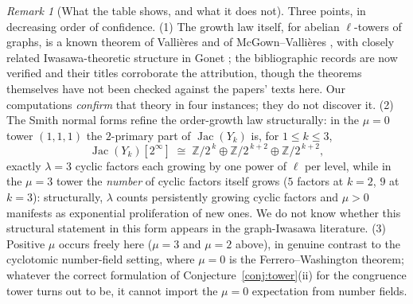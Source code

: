 \documentclass[11pt]{amsart}
\numberwithin{equation}{section}
\theoremstyle{definition}
\theoremstyle{remark}
\newtheorem{remark}[theorem]{Remark}
\newcommand{\Z}{\mathbb{Z}}
\newcommand{\Jac}{\operatorname{Jac}}
\begin{document}
\begin{remark}[What the table shows, and what it does not]\label{rem:towerhonest}
Three points, in decreasing order of confidence. (1) The growth law itself, for abelian
$\ell$-towers of graphs, is a known theorem of Vallières and of McGown--Vallières
\cite{Vallieres,McGownVallieres}, with closely related Iwasawa-theoretic structure in
Gonet \cite{Gonet}; the bibliographic records are now verified and their titles
corroborate the attribution, though the theorems themselves have not been checked
against the papers' texts here. Our computations \emph{confirm} that theory in four
instances; they do not discover it. (2) The Smith normal forms refine the order-growth
law structurally: in the $\mu=0$ tower $(1,1,1)$ the $2$-primary part of $\Jac(Y_k)$ is,
for $1\le k\le3$,
\[
\Jac(Y_k)[2^\infty]\;\cong\;\Z/2^{\,k}\oplus\Z/2^{\,k+2}\oplus\Z/2^{\,k+2},
\]
exactly $\lambda=3$ cyclic factors each growing by one power of $\ell$ per level, while
in the $\mu=3$ tower the \emph{number} of cyclic factors itself grows ($5$ factors at
$k=2$, $9$ at $k=3$): structurally, $\lambda$ counts persistently growing cyclic factors
and $\mu>0$ manifests as exponential proliferation of new ones. We do not know whether
this structural statement in this form appears in the graph-Iwasawa literature.
(3) Positive $\mu$ occurs freely here ($\mu=3$ and $\mu=2$ above), in genuine contrast to
the cyclotomic number-field setting, where $\mu=0$ is the Ferrero--Washington theorem;
whatever the correct formulation of Conjecture~\ref{conj:tower}(ii) for the congruence
tower turns out to be, it cannot import the $\mu=0$ expectation from number fields.
\end{remark}
\end{document}
